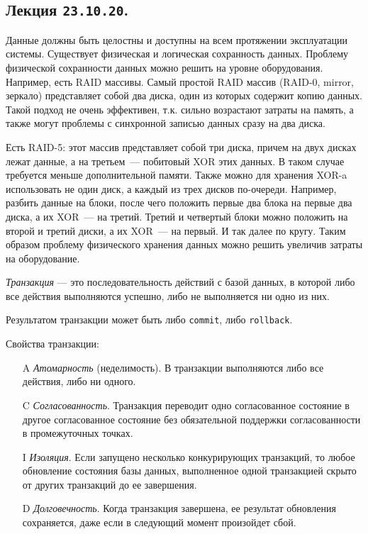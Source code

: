\subsection{%
  Лекция \texttt{23.10.20}.%
}


Данные должны быть целостны и доступны на всем протяжении эксплуатации системы.
Существует физическая и логическая сохранность данных. Проблему физической
сохранности данных можно решить на уровне оборудования. Например, есть RAID
массивы. Самый простой RAID массив (RAID-0, mirror, зеркало) представляет собой
два диска, один из которых содержит копию данных. Такой подход не очень
эффективен, т.к. сильно возрастают затраты на память, а также могут проблемы с
синхронной записью данных сразу на два диска.

Есть RAID-5: этот массив представляет собой три диска, причем на двух
дисках лежат данные, а на третьем~--- побитовый XOR этих данных. В таком случае
требуется меньше дополнительной памяти. Также можно для хранения XOR-a
использовать не один диск, а каждый из трех дисков по-очереди. Например, разбить
данные на блоки, после чего положить первые два блока на первые два диска, а их
XOR~--- на третий. Третий и четвертый блоки можно положить на второй и третий
диски, а их XOR~--- на первый. И так далее по кругу. Таким образом проблему
физического хранения данных можно решить увеличив затраты на оборудование.

\begin{definition}
  \textit{Транзакция} --- это последовательность действий с базой данных, 
  в которой либо все действия выполняются успешно, либо не выполняется ни одно из них.

  Результатом транзакции может быть либо \texttt{commit}, либо
  \texttt{rollback}.
\end{definition}

Свойства транзакции:

\begin{enumerate}
\item[A]
  \textit{Атомарность} (неделимость). 
  В транзакции выполняются либо все действия, либо ни одного.

\item[C]
  \textit{Согласованность}.
  Транзакция переводит одно согласованное состояние в другое
  согласованное состояние без обязательной поддержки согласованности в
  промежуточных точках.

\item[I]
  \textit{Изоляция}. Если запущено несколько конкурирующих транзакций, то любое
  обновление состояния базы данных, выполненное одной транзакцией скрыто от
  других транзакций до ее завершения.

\item[D]
  \textit{Долговечность}. Когда транзакция завершена, ее результат обновления
  сохраняется, даже если в следующий момент произойдет сбой.
\end{enumerate}

